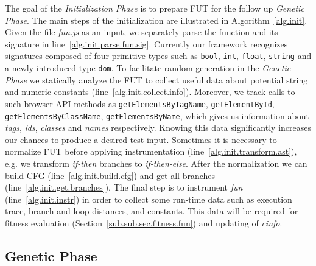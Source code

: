 \documentclass[sigconf]{acmart}
\begin{document}
The goal of the \emph{Initialization Phase} is to prepare FUT for the follow up \emph{Genetic Phase}. The main steps of the initialization are illustrated in Algorithm~\ref{alg.init}. Given the file \emph{fun.js} as an input, we separately parse the function and its signature in line~\ref{alg.init.parse.fun.sig}. Currently our framework recognizes signatures composed of four primitive types such as \texttt{bool}, \texttt{int}, \texttt{float}, \texttt{string} and a newly introduced type \texttt{dom}. To facilitate random generation in the \emph{Genetic Phase} we statically analyze the FUT to collect useful data about potential string and numeric constants (line~\ref{alg.init.collect.info}). Moreover, we track calls to such browser API methods as \texttt{getElementsByTagName}, \texttt{getElementById}, \texttt{getElementsByClassName}, \texttt{getElementsByName}, which gives us information about \emph{tags}, \emph{ids}, \emph{classes} and \emph{names} respectively. Knowing this data significantly increases our chances to produce a desired test input. Sometimes it is necessary to normalize FUT before applying instrumentation (line~\ref{alg.init.transform.ast}), e.g. we transform \emph{if-then} branches to \emph{if-then-else}. After the normalization we can build CFG (line~\ref{alg.init.build.cfg}) and get all branches (line~\ref{alg.init.get.branches}). The final step is to instrument \emph{fun} (line~\ref{alg.init.instr}) in order to collect some run-time data such as execution trace, branch and loop distances, and constants. This data will be required for fitness evaluation (Section~\ref{sub.sub.sec.fitness.fun}) and updating of \emph{cinfo}.


\subsection{Genetic Phase}
\label{sub.sec.genetic.phase}
\end{document}
